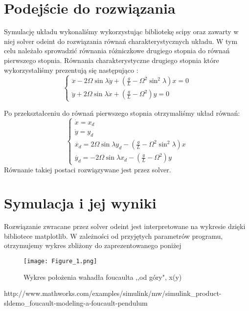 \documentclass[a4paper]{article}
\begin{document}
\section{Podejście do rozwiązania}
Symulację układu wykonaliśmy wykorzystując bibliotekę scipy oraz zawarty w niej solver odeint do rozwiązania równań charakterystycznych układu. W tym celu należało sprowadzić równania różniczkowe drugiego stopnia do równań pierwszego stopnia. Równania charakterystyczne drugiego stopnia które wykorzystaliśmy prezentują się następująco \cite{matlab}:
$$ \begin{cases}
\ddot{x} - 2\Omega \sin{\lambda} \dot{y} + (\frac{g}{L}-\Omega^2 \sin^2{\lambda}) x =0\\
\ddot{y} + 2\Omega\sin{\lambda} \dot{x} + (\frac{g}{L} - \Omega^2) y =0
\end{cases}$$

Po przekształceniu do równań pierwszego stopnia otrzymaliśmy układ równań:
$$\begin{cases}
\dot{x} = x_d \\
\dot{y} = y_d \\
\dot{x_d} = 2\Omega \sin{\lambda} y_d - (\frac{g}{L}-\Omega^2 \sin^2{\lambda}) x \\
\dot{y_d} = -2\Omega \sin{\lambda} x_d - (\frac{g}{L} - \Omega^2) y
\end{cases}$$
Równanie takiej postaci rozwiązywane jest przez solver.
\newpage
\section{Symulacja i jej wyniki}
Rozwiązanie zwracane przez solver odeint jest interpretowane na wykresie dzięki bibliotece matplotlib. W zależności od przyjętych parametrów programu, otrzymujemy wykres zbliżony do zaprezentowanego poniżej
\begin{figure}[h]
\begin{center}
\texttt{[image: Figure\_1.png]}
\end{center}
\caption{Wykres położenia wahadła foucaulta ,,od góry", x(y)}
\end{figure}

\begin{thebibliography}{1}
 http://www.mathworks.com/examples/simulink/mw/simulink\_product-sldemo\_foucault-modeling-a-foucault-pendulum
\end{thebibliography}
\end{document}
